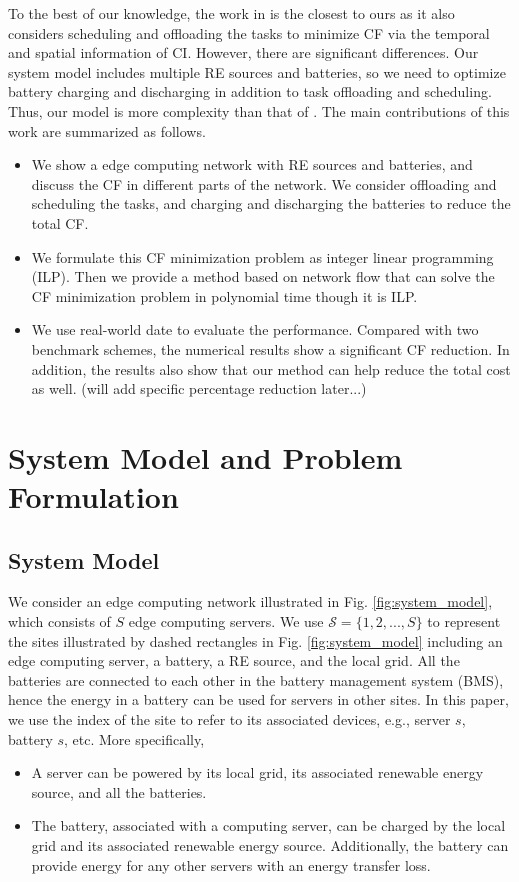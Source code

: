 \documentclass[conference, 10pt, ﬁnal, letterpaper, twocolumn]{IEEEtran}
\begin{document}
To the best of our knowledge, the work in \cite{yang2022carbon} is the closest to ours as it also considers scheduling and offloading the tasks to minimize CF via the temporal and spatial information of CI. However, there are significant differences. Our system model includes multiple RE sources and batteries, so we need to optimize battery charging and discharging in addition to task offloading and scheduling. Thus, our model is more complexity than that of \cite{yang2022carbon}. The main contributions of this work are summarized as follows.
\begin{itemize}
    \item We show a edge computing network with RE sources and batteries, and discuss the CF in different parts of the network. We consider offloading and scheduling the tasks, and charging and discharging the batteries to reduce the total CF. 
    \item We formulate this CF minimization problem as integer linear programming (ILP). Then we provide a method based on network flow that can solve the CF minimization problem in polynomial time though it is ILP.
    \item We use real-world date to evaluate the performance. Compared with two benchmark schemes, the numerical results show a significant CF reduction. In addition, the results also show that our method can help reduce the total cost as well. {\color{red}(will add specific percentage reduction later...)}
\end{itemize}

\section{System Model and Problem Formulation}



\subsection{System Model}
We consider an edge computing network illustrated in Fig. \ref{fig:system_model}, which consists of $S$ edge computing servers. We use $\mathcal{S} = \{1,2,...,S\}$ to represent the sites illustrated by dashed rectangles in Fig. \ref{fig:system_model} including an edge computing server, a battery, a RE source, and the local grid. All the batteries are connected to each other in the battery management system (BMS), hence the energy in a battery can be used for servers in other sites. In this paper, we use the index of the site to refer to its associated devices, e.g., server $s$, battery $s$, etc. More specifically,
\begin{itemize}
    \item A server can be powered by its local grid, its associated renewable energy source, and all the batteries. 
    \item The battery, associated with a computing server, can be charged by the local grid and its associated renewable energy source. Additionally, the battery can provide energy for any other servers with an energy transfer loss.
\end{itemize}
\end{document}
